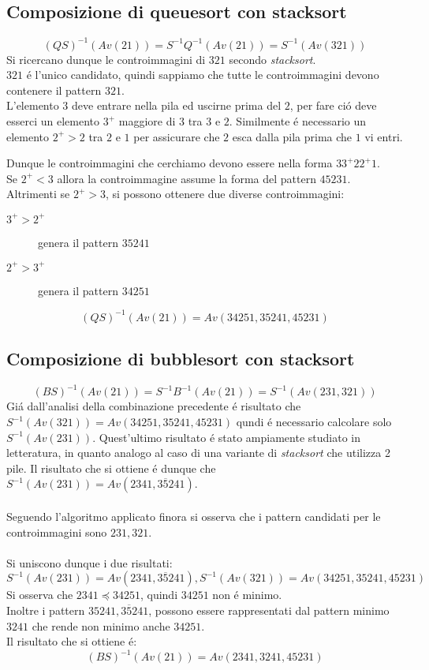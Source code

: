 \subsection*{Composizione  di {queuesort} con {stacksort}}
$$(QS)^{-1}(Av(21))=S^{-1}Q^{-1}(Av(21))=S^{-1}(Av(321))$$
Si ricercano dunque le controimmagini di $321$ secondo \textit{stacksort}.\\$321$ \'e l'unico candidato, quindi sappiamo che tutte le controimmagini devono contenere il pattern $321$.\\
L'elemento $3$ deve entrare nella pila ed uscirne prima del $2$, per fare ci\'o deve esserci un elemento $3^+$ maggiore di $3$ tra $3$ e $2$. Similmente \'e necessario un elemento $2^+>2$ tra $2$ e $1$ per assicurare che $2$ esca dalla pila prima che $1$ vi entri.\\
\begin{center}
\end{center}
Dunque le controimmagini che cerchiamo devono essere nella forma $33^+22^+1$.\\
Se $2^+<3$ allora la controimmagine assume la forma del pattern $45231$.\\
Altrimenti se $2^+>3$, si possono ottenere due diverse controimmagini:
\begin{description}
	\item[$3^+>2^+$] genera il pattern $35241$
	\item[$2^+>3^+$] genera il pattern $34251$
\end{description}
$$(QS)^{-1}(Av(21)) = Av(34251, 35241, 45231)$$
\subsection*{Composizione di {bubblesort} con {stacksort}}
$$(BS)^{-1}(Av(21))=S^{-1}B^{-1}(Av(21))=S^{-1}(Av(231,321))$$
Gi\'a dall'analisi della combinazione precedente \'e risultato che $S^{-1}(Av(321))=Av(34251, 35241, 45231)$ qundi \'e necessario calcolare solo $S^{-1}(Av(231))$. Quest'ultimo risultato \'e stato ampiamente studiato in letteratura, in quanto analogo al caso di una variante di \textit{stacksort} che utilizza 2 pile. Il risultato che si ottiene \'e dunque che $S^{-1}(Av(231))=Av(2341, 3\overline{5}241)$\cite{claesson2012sorting}.\\\\
Seguendo l'algoritmo applicato finora si osserva che i pattern candidati per le controimmagini sono $231,321$.\\\\
Si uniscono dunque i due risultati:
$$S^{-1}(Av(231))=Av(2341,3\overline{5}241), S^{-1}(Av(321))=Av(34251, 35241, 45231)$$
Si osserva che $2341\preceq 34251$, quindi $34251$ non \'e minimo.\\
Inoltre i pattern $35241, 3\overline{5}241$, possono essere rappresentati dal pattern minimo $3241$ che rende non minimo anche $34251$.\\Il risultato che si ottiene \'e:$$(BS)^{-1}(Av(21))=Av(2341,3241,45231)$$
